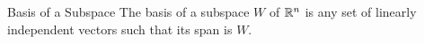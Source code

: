 \begin{example}{}{}
\end{example}

\begin{defbox}{Basis of a Subspace}{}
    The basis of a subspace $W$ of $\mathbb R^{n}$ is any set of linearly independent vectors such that its span is $W$.
\end{defbox}